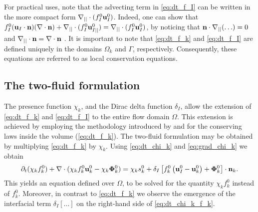 For practical uses, note that the advecting term in \ref{eq:dt_f_I} can be written in the more compact form $\mathbf{\nabla}_{||}\cdot(f_I^0 \textbf{u}_I^0)$. 
Indeed, one can show that $f_I^0 (\textbf{u}_I \cdot \textbf{n})(\mathbf{\nabla}\cdot \textbf{n})
+\mathbf{\nabla}_{||}\cdot(f_I^0 \textbf{u}_{I||}^0) = \mathbf{\nabla}_{||}\cdot(f_I^0 \textbf{u}_I^0)$, by noticing that $\textbf{n}\cdot\mathbf{\nabla}_{||}(\ldots) = 0$ and $\mathbf{\nabla}_{||}\cdot\textbf{n} = \mathbf{\nabla}\cdot\textbf{n}$ \citep{nadim1996concise}.
It is important to note that \ref{eq:dt_f_k} and \ref{eq:dt_f_I} are defined uniquely in the domains $\Omega_k$ and $\Gamma$, respectively.
Consequently, these equations are referred to as local conservation equations. 


\subsection{The two-fluid formulation}
The presence function $\chi_k$, and the Dirac delta function $\delta_I$, allow the extension of \ref{eq:dt_f_k} and \ref{eq:dt_f_I} to the entire flow domain $\Omega$. 
This extension is achieved by employing the methodology introduced by \citet{drew1983mathematical} and \citet{kataoka1986local} for the conserving laws inside the volume (\ref{eq:dt_f_k}).
The two-fluid formulation may be obtained by multiplying \ref{eq:dt_f_k} by $\chi_k$. 
Using \ref{eq:dt_chi_k} and \ref{eq:grad_chi_k} we obtain
\begin{equation}
    \partial_t (\chi_k f_k^0)
    + \mathbf{\nabla}\cdot (
        \chi_k f_k^0 \textbf{u}_k^0
        - \chi_k \mathbf{\Phi}_k^0 
        )
    = 
    \chi_k s_k^0
    + \delta_I\left[
        f_k^0
        \left(
            \textbf{u}_I^0
            - \textbf{u}_k^0
        \right)
        + \mathbf{\Phi}_k^0
    \right]
    \cdot \textbf{n}_k.
    \label{eq:dt_chi_k_f_k}
\end{equation}
This yields an equation defined over $\Omega$, to be solved for the quantity $\chi_k f_k^0$ instead of $f_k^0$. 
Moreover, in contrast to \ref{eq:dt_f_k} we observe the emergence of the interfacial term $ \delta_I[\ldots]$ on the right-hand side of \ref{eq:dt_chi_k_f_k}. 

